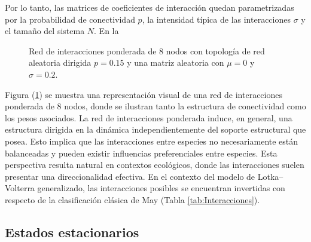 Por lo tanto, las matrices de coeficientes de interacción quedan parametrizadas por la probabilidad de conectividad $p$, la intensidad típica de las interacciones $\sigma$ y el tamaño del sistema $N$. En la 
\begin{figure} \vspace{-20pt} \begin{center}
		 
	\end{center} 
	\vspace{-52pt} 
	\caption{Red de interacciones ponderada de 8 nodos con topología de red aleatoria dirigida $p=0.15$ y una matriz aleatoria con $\mu=0$ y $\sigma=0.2$.} 
	\vspace{-10pt}
	\label{fig:RedIncidencias}
\end{figure} 
Figura (\ref{fig:RedIncidencias}) se muestra una representación visual de una red de interacciones ponderada de 8 nodos, donde se ilustran tanto la estructura de conectividad como los pesos asociados. La red de interacciones ponderada induce, en general, una estructura dirigida en la dinámica independientemente del soporte estructural que posea. Esto implica que las interacciones entre especies no necesariamente están balanceadas y pueden existir influencias preferenciales entre especies. Esta perspectiva resulta natural en contextos ecológicos, donde las interacciones suelen presentar una direccionalidad efectiva. En el contexto del modelo de Lotka--Volterra generalizado, las interacciones posibles se encuentran invertidas con respecto de la clasificación clásica de May (Tabla \eqref{tab:Interacciones}).


\subsection{Estados estacionarios}\label{sec:PuntosFijos}

